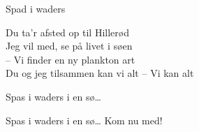\begin{song}{Spad i waders}
  \begin{SBSection*}
Du ta'r afsted op til Hillerød\\
Jeg vil med, se på livet i søen\\
 -- Vi finder en ny plankton art\\
Du og jeg tilsammen kan vi alt
 -- Vi kan alt
  \end{SBSection*}

  \begin{SBChorus}
Spas i waders i en sø\ldots
  \end{SBChorus}

  \begin{SBChorus}
Spas i waders i en sø\ldots
Kom nu med!
  \end{SBChorus}
\end{song}